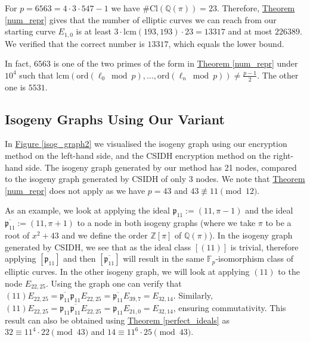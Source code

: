 \documentclass[openany, a4paper, 10pt]{book}
\theoremstyle{plain}
\theoremstyle{plain}
\theoremstyle{plain}
\theoremstyle{definition}
\theoremstyle{plain}
\theoremstyle{definition}
\theoremstyle{remark}
\newcommand{\figref}[1]{\hyperref[#1]{Figure \ref{#1}}}
\newcommand{\theoref}[1]{\hyperref[#1]{Theorem \ref{#1}}}
\begin{document}
\begin{examplebox}
    For $p=6563=4 \cdot 3 \cdot 547-1$ we have $\#\mathrm{Cl}(\mathbb Q(\pi))=23$.
    Therefore, \theoref{num_repr} gives that the number of elliptic curves we can reach from our starting curve $E_{1,0}$ is at least $3\cdot \mathrm{lcm}(193, 193)\cdot 23 = 13317$ and at most $226389$.
    We verified that the correct number is $13317$, which equals the lower bound.

    In fact, $6563$ is one of the two primes of the form in \theoref{num_repr} under $10^4$ such that $\mathrm{lcm}(\mathrm{ord}(\ell_0 \bmod p), \dots, \mathrm{ord}(\ell_n \bmod p)) \neq \frac{p-1}{2}$.
    The other one is $5531$.
\end{examplebox}

\subsection{Isogeny Graphs Using Our Variant}
In \figref{isog_graph2} we visualised the isogeny graph using our encryption method on the left-hand side, and the CSIDH encryption method on the right-hand side.
The isogeny graph generated by our method has 21 nodes, compared to the isogeny graph generated by CSIDH of only 3 nodes.
We note that \theoref{num_repr} does not apply as we have $p=43$ and $43\not\equiv 11 \pmod {12}$.

As an example, we look at applying the ideal $\mathfrak p_{11}:= (11, \pi-1)$ and the ideal $\overline{\mathfrak p_{11}}:= (11, \pi+1)$ to a node in both isogeny graphs (where we take $\pi$ to be a root of $x^2+43$ and we define the order $\mathbb Z[\pi]$ of $\mathbb Q(\pi)$).
In the isogeny graph generated by CSIDH, we see that as the ideal class $[(11)]$ is trivial, therefore applying $[\mathfrak p_{11}]$ and then $[\overline{\mathfrak p_{11}}]$ will result in the same $\mathbb F_p$-isomorphism class of elliptic curves.
In the other isogeny graph, we will look at applying $(11)$ to the node $E_{22,25}$.
Using the graph one can verify that $(11)E_{22,25} = \overline{\mathfrak p_{11}} \mathfrak p_{11} E_{22,25} = \overline{\mathfrak p_{11}}E_{39,7} = E_{32,14}$.
Similarly, $(11)E_{22,25} = \mathfrak p_{11} \overline{\mathfrak p_{11}} E_{22,25} = \mathfrak p_{11} E_{21,0} = E_{32,14}$, ensuring commutativity.
This result can also be obtained using \theoref{perfect_ideals} as $32\equiv 11^4\cdot 22 \pmod {43}$ and $14 \equiv 11^6\cdot 25 \pmod {43}$.
\end{document}
